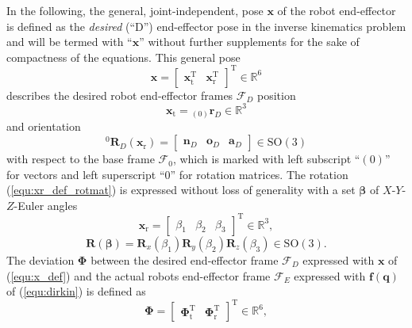 \documentclass[robotics,article,submit,moreauthors,pdftex]{Definitions/mdpi}
\newcommand{\bm}[1]{\boldsymbol{#1}}
\newcommand{\ortvek}[4]{{ }_{(#1)}{\boldsymbol{#2}}^{#3}_{#4} }
\newcommand{\vek}[3]{\boldsymbol{#1}^{#2}_{#3}}
\newcommand{\rotmat}[2]{{{ }^{#1}\boldsymbol{R}}_{#2}}
\newcommand{\transp}[0]{{\mathrm{T}}}
\newcommand{\ks}[1]{{\mathcal{F}}_{#1}}
\begin{document}
In the following, the general, joint-independent, pose $\bm{x}$ of the robot end-effector is defined as the \emph{desired} (``D'') end-effector pose in the inverse kinematics problem and will be termed with ``$\bm{x}$'' without further supplements for the sake of compactness of the equations.
This general pose
%
\begin{equation}
\bm{x}
=
\begin{bmatrix}
\bm{x}_{\mathrm{t}}^\transp & \bm{x}_{\mathrm{r}}^\transp
\end{bmatrix}^\transp
\in {\mathbb{R}}^{6}
\label{equ:x_def}
\end{equation}
%
describes the desired robot end-effector frames $\ks{D}$ position 
%
\begin{equation}
\bm{x}_{\mathrm{t}}
=
\ortvek{0}{r}{}{D}
\in {\mathbb{R}}^{3}
\label{equ:xt_def}
\end{equation}  
%
and orientation 
%
\begin{equation}
\rotmat{0}{D} (\bm{x}_{\mathrm{r}})
=
\begin{bmatrix}\vek{n}{}{D} & \vek{o}{}{D} & \vek{a}{}{D}\end{bmatrix} \in \mathrm{SO(3)}
\label{equ:xr_def_rotmat}
\end{equation}
%
with respect to the base frame $\ks{0}$, which is marked with left subscript ``$(0)$'' for vectors and left superscript ``$0$'' for rotation matrices.
The rotation (\ref{equ:xr_def_rotmat}) is expressed without loss of generality with a set $\bm{\beta}$ of $X$-$Y$-$Z$-Euler angles
%
\begin{equation}
\bm{x}_{\mathrm{r}}
=
\begin{bmatrix}
\beta_1  & \beta_2 & \beta_3
\end{bmatrix}^{\mathrm{T}}
\in {\mathbb{R}}^{3},
\label{equ:xr_def}
\end{equation} 
%
\begin{equation}
\bm{R}(\bm{\beta}) = \bm{R}_x(\beta_1) \bm{R}_y(\beta_2) \bm{R}_z(\beta_3) \in \mathrm{SO(3)}.
\label{equ:def_rmat_xyz}
\end{equation}
%
The deviation $\bm{\Phi}$ between the desired end-effector frame $\ks{D}$ expressed with $\bm{x}$ of (\ref{equ:x_def}) and the actual robots end-effector frame $\ks{E}$ expressed with $\bm{f}(\bm{q})$ of (\ref{equ:dirkin}) is defined as
%
\begin{equation}
\bm{\Phi}=\begin{bmatrix}
\bm{\Phi}_{\mathrm{t}}^\transp & \bm{\Phi}_{\mathrm{r}}^\transp
\end{bmatrix}^\transp \in {\mathbb{R}}^{6},
\label{equ:Phi_def}
\end{equation}
\end{document}
